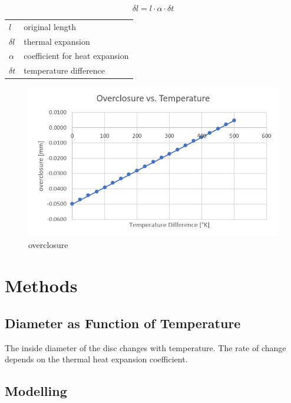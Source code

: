\documentclass[12pt]{article}
\makeatletter
\newenvironment{conditions}
  {\par\vspace{\abovedisplayskip}\noindent\begin{tabular}{>{$}l<{$} @{${}={}$} l}}
  {\end{tabular}\par\vspace{\belowdisplayskip}}
\makeatother
\begin{document}
\begin{equation}\label{eq:1}
  \delta l = l \cdot \alpha \cdot \delta t
\end{equation}
\begin{conditions}
  l         &  original length\\
  \delta l  &  thermal expansion\\
  \alpha    &  coefficient for heat expansion\\
  \delta t  &  temperature difference
\end{conditions}

\begin{figure}[!htb]
  \centering
  \includegraphics[width=0.9\linewidth]{pics/overclosure_temperature}
 \caption{overclosure}
  \label{fig:1}
\end{figure}



\newpage
\section{Methods}

\subsection{Diameter as Function of Temperature}

The inside diameter of the disc changes with temperature. The rate of change 
depends on the thermal heat expansion coefficient.




\subsection{Modelling}
\end{document}
